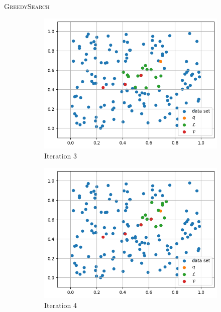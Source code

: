 \begin{frame}{\textsc{GreedySearch}}
    \begin{figure}[h]
        \centering
        \hfill
        \begin{subfigure}{0.31\textwidth}
            \includegraphics[width=\textwidth]{images/greedy-search-3}
            \caption{Iteration 3}
        \end{subfigure}
        \hfill
        \begin{subfigure}{0.31\textwidth}
            \includegraphics[width=\textwidth]{images/greedy-search-4}
            \caption{Iteration 4}
        \end{subfigure}
        \hfill
        \begin{subfigure}{0.31\textwidth}

\end{subfigure}
\end{figure}
\end{frame}

